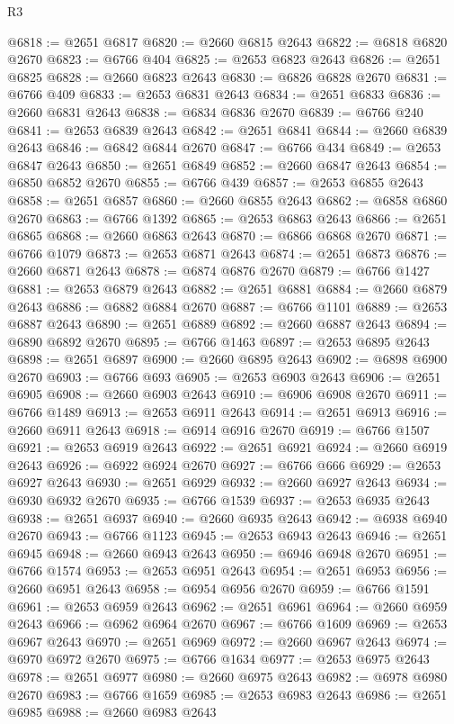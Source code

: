 \begin{lexlean}{R3}
\begin{coremodule}
@6818 := @2651 @6817
@6820 := @2660 @6815 @2643
@6822 := @6818 @6820 @2670
@6823 := @6766 @404
@6825 := @2653 @6823 @2643
@6826 := @2651 @6825
@6828 := @2660 @6823 @2643
@6830 := @6826 @6828 @2670
@6831 := @6766 @409
@6833 := @2653 @6831 @2643
@6834 := @2651 @6833
@6836 := @2660 @6831 @2643
@6838 := @6834 @6836 @2670
@6839 := @6766 @240
@6841 := @2653 @6839 @2643
@6842 := @2651 @6841
@6844 := @2660 @6839 @2643
@6846 := @6842 @6844 @2670
@6847 := @6766 @434
@6849 := @2653 @6847 @2643
@6850 := @2651 @6849
@6852 := @2660 @6847 @2643
@6854 := @6850 @6852 @2670
@6855 := @6766 @439
@6857 := @2653 @6855 @2643
@6858 := @2651 @6857
@6860 := @2660 @6855 @2643
@6862 := @6858 @6860 @2670
@6863 := @6766 @1392
@6865 := @2653 @6863 @2643
@6866 := @2651 @6865
@6868 := @2660 @6863 @2643
@6870 := @6866 @6868 @2670
@6871 := @6766 @1079
@6873 := @2653 @6871 @2643
@6874 := @2651 @6873
@6876 := @2660 @6871 @2643
@6878 := @6874 @6876 @2670
@6879 := @6766 @1427
@6881 := @2653 @6879 @2643
@6882 := @2651 @6881
@6884 := @2660 @6879 @2643
@6886 := @6882 @6884 @2670
@6887 := @6766 @1101
@6889 := @2653 @6887 @2643
@6890 := @2651 @6889
@6892 := @2660 @6887 @2643
@6894 := @6890 @6892 @2670
@6895 := @6766 @1463
@6897 := @2653 @6895 @2643
@6898 := @2651 @6897
@6900 := @2660 @6895 @2643
@6902 := @6898 @6900 @2670
@6903 := @6766 @693
@6905 := @2653 @6903 @2643
@6906 := @2651 @6905
@6908 := @2660 @6903 @2643
@6910 := @6906 @6908 @2670
@6911 := @6766 @1489
@6913 := @2653 @6911 @2643
@6914 := @2651 @6913
@6916 := @2660 @6911 @2643
@6918 := @6914 @6916 @2670
@6919 := @6766 @1507
@6921 := @2653 @6919 @2643
@6922 := @2651 @6921
@6924 := @2660 @6919 @2643
@6926 := @6922 @6924 @2670
@6927 := @6766 @666
@6929 := @2653 @6927 @2643
@6930 := @2651 @6929
@6932 := @2660 @6927 @2643
@6934 := @6930 @6932 @2670
@6935 := @6766 @1539
@6937 := @2653 @6935 @2643
@6938 := @2651 @6937
@6940 := @2660 @6935 @2643
@6942 := @6938 @6940 @2670
@6943 := @6766 @1123
@6945 := @2653 @6943 @2643
@6946 := @2651 @6945
@6948 := @2660 @6943 @2643
@6950 := @6946 @6948 @2670
@6951 := @6766 @1574
@6953 := @2653 @6951 @2643
@6954 := @2651 @6953
@6956 := @2660 @6951 @2643
@6958 := @6954 @6956 @2670
@6959 := @6766 @1591
@6961 := @2653 @6959 @2643
@6962 := @2651 @6961
@6964 := @2660 @6959 @2643
@6966 := @6962 @6964 @2670
@6967 := @6766 @1609
@6969 := @2653 @6967 @2643
@6970 := @2651 @6969
@6972 := @2660 @6967 @2643
@6974 := @6970 @6972 @2670
@6975 := @6766 @1634
@6977 := @2653 @6975 @2643
@6978 := @2651 @6977
@6980 := @2660 @6975 @2643
@6982 := @6978 @6980 @2670
@6983 := @6766 @1659
@6985 := @2653 @6983 @2643
@6986 := @2651 @6985
@6988 := @2660 @6983 @2643

\end{coremodule}
\end{lexlean}

